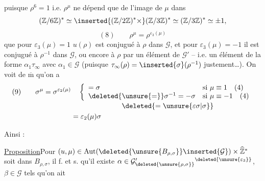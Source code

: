 puisque $\rho^6=1$ i.e. $\rho^\mu$ ne dépend que de l'image
de $\mu$ dans
\[
(\mathbb Z/6\mathbb Z)^*\simeq
\inserted{(\mathbb Z/2\mathbb Z)^*\times}
(\mathbb Z/3\mathbb Z)^*\simeq(\mathbb Z/3\mathbb Z)^*\simeq\pm1,
\]
\[
(8)\qquad \rho^\mu=\rho^{\varepsilon_3(\mu)}
\]
que pour $\varepsilon_3(\mu)=1$
$u(\rho)$ est conjugué à $\rho$ dans $\mathcal{G}$, et pour
$\varepsilon_3(\mu)=-1$ il est conjugué à $\rho^{-1}$ dans
$\mathcal{G}$, ou encore à $\rho$ par un élément de
$\mathcal{G}'$ -- i.e. un élément de la forme $\alpha_1\tau_\infty$
avec $\alpha_1\in\mathcal{G}$ (puisque
$\tau_\infty(\rho)=\inserted{\sigma}(\rho^{-1})$ justement\ldots).
\deleted{\[
(9)\qquad u(\rho)=\zeta\rho,\qquad u(\sigma)=\eta\sigma
\quad(\zeta,\eta\in\mathcal{G})
\]}
\deleted{\[
(10)\qquad \zeta=\alpha\rho(\alpha)^{-1},
\qquad\eta=\beta
\]}
On voit de $\overline{\mathrm m}$ qu'on a
\[
\begin{aligned}
(9)\qquad \sigma^\mu=\sigma^{\varepsilon_2(\mu)}
&\quad\left\{\begin{array}{ll}
=\sigma&\text{si }\mu\equiv1\quad(4)\\
\deleted{\unsure{=}}\sigma^{-1}=-\sigma
&\text{si }\mu\equiv-1\quad(4)
\end{array}\right.\\[-2pt]
&\hspace{2.5cm}\deleted{=\unsure{\varepsilon\sigma|\sigma}}\\
&=\varepsilon_2(\mu)\sigma
\end{aligned}
\]

Ainsi :

\uline{Proposition}\quad Pour 
$(u,\mu)\in\operatorname{Aut}
(\deleted{\unsure{B_{\rho,\sigma}}}\inserted{\mathcal{G}})
\times\widehat{\mathbb Z}^{*}$ soit dans $B_{\rho,\sigma}$,
il f. et s. qu'il existe
$\alpha\in\mathcal{G}'_{\deleted{\unsure{\rho,\sigma}}}
{}^{\deleted{\unsure{\varepsilon_3}}}$,
$\beta\in\mathcal{G}$ tels qu'on ait


